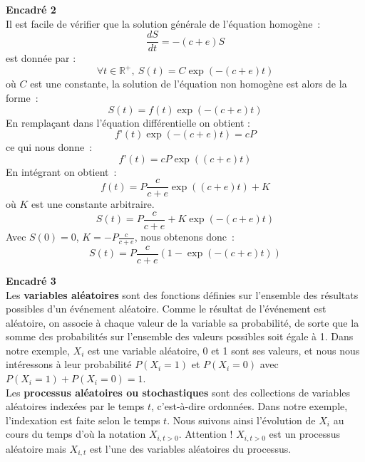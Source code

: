 \setlength{\columnsep}{1cm}
 \begin{minipage}{0.9\linewidth}
 \begin{multicols}{2}
 \textbf{Encadré 2} \\
 Il est facile de vérifier que la solution générale de l’équation homogène~:
 \begin{equation}
\nonumber  \frac{dS}{dt}=-(c+e)S
\end{equation}
est donnée par :
 \begin{equation}
\nonumber \forall t \in \mathbb{R}^+,~ S(t)=C\exp(-(c+e)t)
\end{equation}
où $C$ est une constante, la solution de l’équation non homogène est alors de la forme~:
 \begin{equation}
\nonumber S(t)=f(t) \exp(-(c+e)t)
\end{equation}
En remplaçant dans l’équation différentielle on obtient :
 \begin{equation}
\nonumber f’(t) \exp(-(c+e)t)= cP
\end{equation}
ce qui nous donne~:
 \begin{equation}
\nonumber f’(t)= cP \exp((c+e)t)
\end{equation}
En intégrant on obtient~:
 \begin{equation}
\nonumber f(t)= P\frac{c}{c+e} \exp({(c+e)t}) + K
\end{equation}
où $K$ est une constante arbitraire.
 \begin{equation}
\nonumber S(t)= P\frac{c}{c+e} + K\exp(-(c+e)t)
\end{equation}
Avec $S(0)=0$, $K=-P\frac{c}{c+e}$, nous obtenons donc~:
 \begin{equation}
\nonumber S(t)= P\frac{c}{c+e} (1-\exp(-(c+e)t))
\end{equation}
\end{multicols}
 \end{minipage}
\vspace{2cm}

\setlength{\columnsep}{1cm}
 \begin{minipage}{0.9\linewidth}
\textbf{Encadré 3} \\
Les \textbf{variables aléatoires} sont des fonctions définies sur l’ensemble des résultats possibles d’un événement aléatoire. Comme le résultat de l’événement est aléatoire, on associe à chaque valeur de la variable sa probabilité, de sorte que la somme des probabilités sur l'ensemble des valeurs possibles soit égale à 1. Dans notre exemple, $X_i$ est une variable aléatoire, 0 et 1 sont ses valeurs, et nous nous intéressons à leur probabilité $P(X_i=1)$ et $P(X_i=0)$ avec $P(X_i=1)+P(X_i=0)=1$. \\
Les \textbf{processus aléatoires ou stochastiques} sont des collections de variables aléatoires indexées par le temps $t$, c'est-à-dire ordonnées. Dans notre exemple, l'indexation est faite selon le temps $t$. Nous suivons ainsi l'évolution de $X_i$ au cours du temps d'où la notation $X_{i,t>0}$. Attention ! $X_{i,t>0}$ est un processus aléatoire mais $X_{i,t}$ est l'une des variables aléatoires du processus.
 \end{minipage}
\vspace{2cm}

